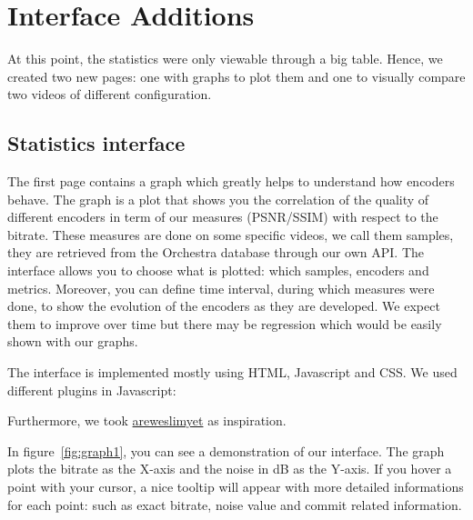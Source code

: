 \documentclass[a4paper,12pt]{article}
\begin{document}
\section{Interface Additions}
At this point, the statistics were only viewable through a big table.
Hence, we created two new pages: one with graphs to plot them and one to visually compare two videos of different configuration.

\subsection{Statistics interface}
The first page contains a graph which greatly helps to understand how encoders behave.
The graph is a plot that shows you the correlation of the quality of different encoders in term of our measures (PSNR/SSIM) with respect to the bitrate.
These measures are done on some specific videos, we call them samples, they are retrieved from the Orchestra database through our own API.
The interface allows you to choose what is plotted: which samples, encoders and metrics.
Moreover, you can define time interval, during which measures were done, to show the evolution of the encoders as they are developed.
We expect them to improve over time but there may be regression which would be easily shown with our graphs.

The interface is implemented mostly using HTML, Javascript and CSS.
We used different plugins in Javascript:
Furthermore, we took \href{http://areweslimyet.com}{areweslimyet} as inspiration.

In figure~\ref{fig:graph1}, you can see a demonstration of our interface.
The graph plots the bitrate as the X-axis and the noise in dB as the Y-axis.
If you hover a point with your cursor, a nice tooltip will appear with more detailed informations for each point: such as exact bitrate, noise value and commit related information.
\end{document}
